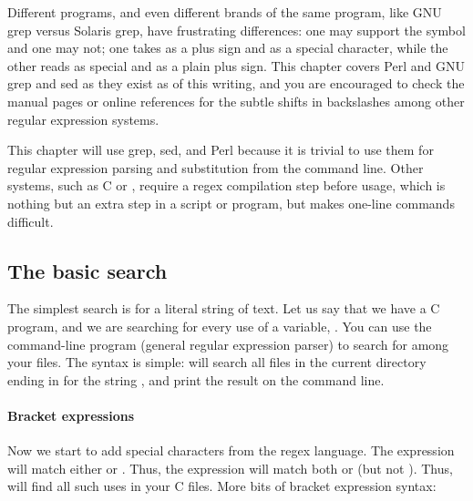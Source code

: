 Different programs, and even different brands of the same
program, like GNU grep versus Solaris grep, have frustrating
differences: one may support the  symbol and one may not; 
one takes \ci{+} as a plus sign and  \ci{\textbs+} as a special
character, while the other reads \ci{+} as special and \ci{\textbs+}
as a plain plus sign. This chapter covers Perl and GNU grep and sed as they exist as
of this writing, and you are encouraged to check the manual pages or
online references for the subtle shifts in backslashes among other
regular expression systems.


This chapter will use grep, sed, and Perl because it is trivial to
use them for regular expression parsing and substitution from the
command line. Other systems, such as C or , require a regex
compilation step before usage, which is nothing but an extra step in a
script or program, but makes one-line commands difficult.

\subsection{The basic search}
The simplest search is for a literal string of text. Let us say that we
have a C program, and we are searching for every use of a variable,
. You can use the command-line program  (general
regular expression parser) to search for  among your files. The
syntax is simple:  will search all files in the current
directory ending in  for the string , and print the result
on the command line.



\paragraph{Bracket expressions} Now we start to add special characters
from the regex language. The expression \ci{[fs]} will match either
 or . Thus, the expression  will match both
 or  (but not ). Thus,  will find all such uses in your C files. More bits of
bracket expression syntax:

